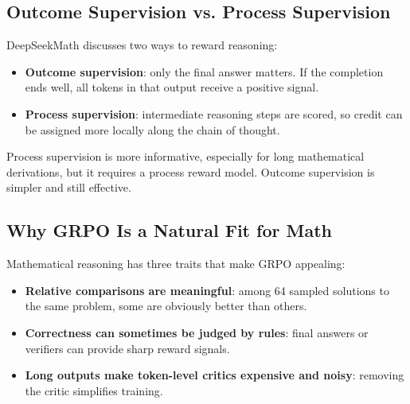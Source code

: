 \documentclass[11pt]{article}
\begin{document}
  \subsection{Outcome Supervision vs. Process Supervision}

  DeepSeekMath discusses two ways to reward reasoning:

  \begin{itemize}
    \item \textbf{Outcome supervision}: only the final answer matters. If the completion ends well, all tokens in that output receive a positive signal.
    \item \textbf{Process supervision}: intermediate reasoning steps are scored, so credit can be assigned more locally along the chain of thought.
  \end{itemize}

  Process supervision is more informative, especially for long mathematical derivations, but it requires a process reward model. Outcome supervision is simpler and still effective.

  \subsection{Why GRPO Is a Natural Fit for Math}

  Mathematical reasoning has three traits that make GRPO appealing:

  \begin{itemize}
    \item \textbf{Relative comparisons are meaningful}: among 64 sampled solutions to the same problem, some are obviously better than others.
    \item \textbf{Correctness can sometimes be judged by rules}: final answers or verifiers can provide sharp reward signals.
    \item \textbf{Long outputs make token-level critics expensive and noisy}: removing the critic simplifies training.
  \end{itemize}
\end{document}
